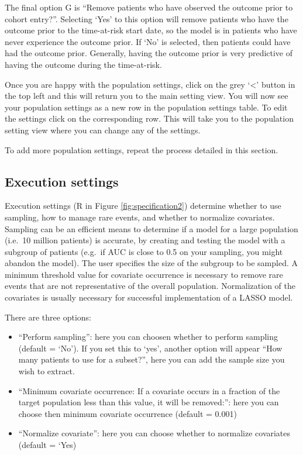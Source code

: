 \documentclass[11pt]{book}
\providecommand{\tightlist}{%
  \setlength{\itemsep}{0pt}\setlength{\parskip}{0pt}}
\begin{document}
The final option G is ``Remove patients who have observed the outcome
prior to cohort entry?''. Selecting `Yes' to this option will remove
patients who have the outcome prior to the time-at-risk start date, so
the model is in patients who have never experience the outcome prior. If
`No' is selected, then patients could have had the outcome prior.
Generally, having the outcome prior is very predictive of having the
outcome during the time-at-risk.

Once you are happy with the population settings, click on the grey
`\textless{}' button in the top left and this will return you to the
main setting view. You will now see your population settings as a new
row in the population settings table. To edit the settings click on the
corresponding row. This will take you to the population setting view
where you can change any of the settings.

To add more population settings, repeat the process detailed in this
section.

\subsection{Execution settings}\label{execution-settings}

Execution settings (R in Figure \ref{fig:specification2}) determine
whether to use sampling, how to manage rare events, and whether to
normalize covariates. Sampling can be an efficient means to determine if
a model for a large population (i.e.~10 million patients) is accurate,
by creating and testing the model with a subgroup of patients (e.g.~if
AUC is close to 0.5 on your sampling, you might abandon the model). The
user specifies the size of the subgroup to be sampled. A minimum
threshold value for covariate occurrence is necessary to remove rare
events that are not representative of the overall population.
Normalization of the covariates is usually necessary for successful
implementation of a LASSO model.

There are three options:

\begin{itemize}
\tightlist
\item
  ``Perform sampling'': here you can choosen whether to perform sampling
  (default = `No'). If you set this to `yes', another option will appear
  ``How many patients to use for a subset?'', here you can add the
  sample size you wish to extract.
\item
  ``Minimum covariate occurrence: If a covariate occurs in a fraction of
  the target population less than this value, it will be removed:'':
  here you can choose then minimum covariate occurrence (default =
  0.001)
\item
  ``Normalize covariate'': here you can choose whether to normalize
  covariates (default = `Yes)
\end{itemize}
\end{document}
